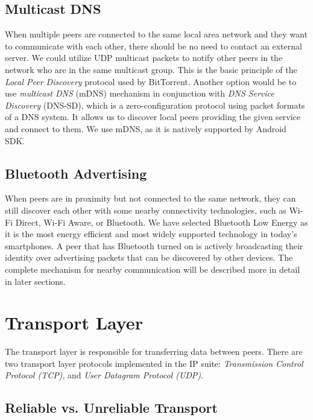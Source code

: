 \subsection{Multicast DNS}

When multiple peers are connected to the same local area network and they want to communicate with each other, there should be no need to contact an external server. We could utilize UDP multicast packets to notify other peers in the network who are in the same multicast group. This is the basic principle of the \textit{Local Peer Discovery} protocol used by BitTorrent. Another option would be to use \textit{multicast DNS} (mDNS) mechanism in conjunction with \textit{DNS Service Discovery} (DNS-SD), which is a zero-configuration protocol using packet formats of a DNS system. It allows us to discover local peers providing the given service and connect to them. We use mDNS, as it is natively supported by Android SDK.

\subsection{Bluetooth Advertising}

When peers are in proximity but not connected to the same network, they can still discover each other with some nearby connectivity technologies, such as Wi-Fi Direct, Wi-Fi Aware, or Bluetooth. We have selected Bluetooth Low Energy as it is the most energy efficient and most widely supported technology in today's smartphones. A peer that has Bluetooth turned on is actively broadcasting their identity over advertising packets that can be discovered by other devices. The complete mechanism for nearby communication will be described more in detail in later sections. %



\section{Transport Layer}

The transport layer is responsible for transferring data between peers. There are two transport layer protocols implemented in the IP suite: \textit{Transmission Control Protocol (TCP)}, and \textit{User Datagram Protocol (UDP)}.

\subsection{Reliable vs. Unreliable Transport}

